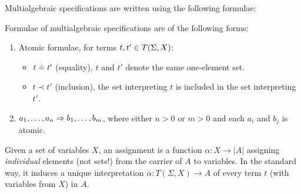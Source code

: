 Multialgebraic specifications are written using the following formulae:
%
\begin{definition}\label{def:masen}
Formulae of multialgebraic specifications are of the following forms:
\begin{enumerate}\MyLPar
\item Atomic formulae, for terms $t, t' \in T(\Sigma,X)$:
\begin{itemize}\MyLPar
\item $t \mathrel{\dot{=} }  t'$ (equality), $t$ and $t'$ denote the same one-element set.
\item $t \prec t'$ (inclusion), the set interpreting $t$ is included in
the set interpreting $t'$.
\end{itemize}
\item $a_1 , \ldots ,a_n \Rightarrow b_1 , \ldots ,b_m$, where either $n>0$ or $m>0$ and
each $a_i$ and $b_j$ is atomic.
\end{enumerate}
\end{definition}
%
Given a set of variables $X$, an assignment is a function $\alpha: X \to |A|$ 
assigning {\em individual} elements (not sets!) from the carrier of $A$ to
variables. In the standard way, it induces a unique
interpretation $\overline{\alpha}: T(\Sigma,X) \to A$ of every term $t$
(with variables from $X$) in
$A$.
 
